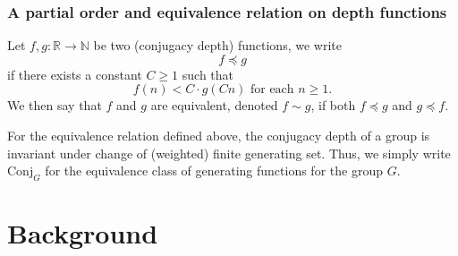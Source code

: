 \documentclass[aspectratio=169,10pt]{beamer}
\renewcommand{\geq}{\geqslant}
\newcommand\Conj{\mathrm{Conj}}
\begin{document}
\begin{frame}[t]
	\frametitle{A partial order and equivalence relation on depth functions}

	\begin{definition}
		Let $f,g\colon \mathbb R \to \mathbb N$ be two (conjugacy depth) functions, we write
		\[
			f\preccurlyeq g
		\]
		if there exists a constant $C\geq 1$ such that
		\[
			f(n) < C\cdot g(Cn)
			\text{ for each }n \geq 1.
		\]
		We then say that $f$ and $g$ are equivalent, denoted $f\sim g$, if both $f\preccurlyeq g$ and $g\preccurlyeq f$.
	\end{definition}

	\begin{lemma}
		For the equivalence relation defined above, the conjugacy depth of a group is invariant under change of (weighted) finite generating set.
		Thus, we simply write $\Conj_G$ for the equivalence class of generating functions for the group $G$.
	\end{lemma}
\end{frame}


\section{Background}
\end{document}
